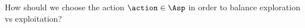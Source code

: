 \begin{sectionbox}\nospacing
  How should we choose the action $\action\in\Asp$ in order to balance exploration vs exploitation?
\end{sectionbox}
